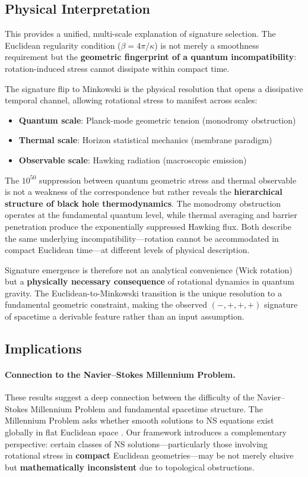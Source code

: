 \documentclass[11pt]{article}
\begin{document}
\subsection{Physical Interpretation}

This provides a unified, multi-scale explanation of signature selection. The Euclidean 
regularity condition ($\beta = 4\pi/\kappa$) is not merely a smoothness requirement 
but the \textbf{geometric fingerprint of a quantum incompatibility}: rotation-induced 
stress cannot dissipate within compact time. 

The signature flip to Minkowski is the physical resolution that opens a dissipative 
temporal channel, allowing rotational stress to manifest across scales:
\begin{itemize}
\item \textbf{Quantum scale}: Planck-mode geometric tension (monodromy obstruction)
\item \textbf{Thermal scale}: Horizon statistical mechanics (membrane paradigm)  
\item \textbf{Observable scale}: Hawking radiation (macroscopic emission)
\end{itemize}

The $10^{50}$ suppression between quantum geometric stress and thermal observable 
is not a weakness of the correspondence but rather reveals the \textbf{hierarchical 
structure of black hole thermodynamics}. The monodromy obstruction operates at the 
fundamental quantum level, while thermal averaging and barrier penetration produce 
the exponentially suppressed Hawking flux. Both describe the same underlying 
incompatibility---rotation cannot be accommodated in compact Euclidean time---at 
different levels of physical description.

Signature emergence is therefore not an analytical convenience (Wick rotation) but 
a \textbf{physically necessary consequence} of rotational dynamics in quantum gravity. 
The Euclidean-to-Minkowski transition is the unique resolution to a fundamental 
geometric constraint, making the observed $(-,+,+,+)$ signature of spacetime a 
derivable feature rather than an input assumption.

\subsection{Implications}

\paragraph{Connection to the Navier--Stokes Millennium Problem.}
These results suggest a deep connection between the difficulty of the Navier--Stokes 
Millennium Problem and fundamental spacetime structure. The Millennium Problem asks 
whether smooth solutions to NS equations exist globally in flat Euclidean space 
\cite{NavierStokesMillennium}. Our framework introduces a complementary perspective: 
certain classes of NS solutions---particularly those involving rotational stress in 
\textbf{compact} Euclidean geometries---may be not merely elusive but 
\textbf{mathematically inconsistent} due to topological obstructions.
\end{document}
